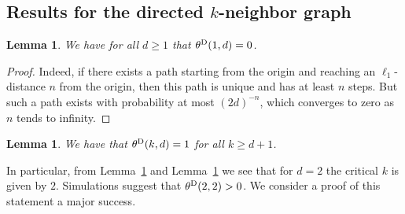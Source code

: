 \documentclass{article}
\newtheorem{lemma}[theorem]{Lemma}
\theoremstyle{definition}
\newcommand{\1}{\mathbbm{1}}
\newcommand{\0}{\mathbf{o}}
\begin{document}
\subsection{Results for the directed $k$-neighbor graph}
\begin{lemma}\label{lem:surenoperc}
We have for all $d\ge 1$ that $\theta^{\rm D}(1,d)=0$.
\end{lemma}
\begin{proof}
Indeed, if there exists a path starting from the origin and reaching an $\ell_1$-distance $n$ from the origin, then this path is unique and has at least $n$ steps. But such a path exists with probability at most $(2d)^{-n}$, which converges to zero as $n$ tends to infinity.
\end{proof}
\begin{lemma}\label{lem:sureperc}
    We have that $\theta^{\rm D}(k,d)=1$ for all $k\ge d+1$.
\end{lemma}
In particular, from Lemma~\ref{lem:surenoperc} and Lemma~\ref{lem:sureperc} we see that for $d=2$ the critical $k$ is given by $2$. Simulations suggest that $\theta^{\rm D}(2,2)>0$. We consider a proof of this statement a major success. 
\end{document}
